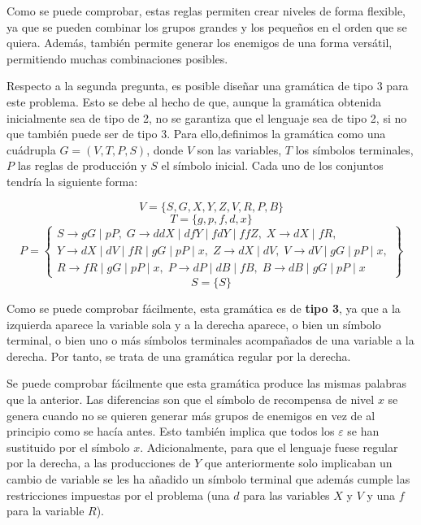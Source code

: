 \documentclass[11pt,a4paper]{article}
\begin{document}
		Como se puede comprobar, estas reglas permiten crear niveles de forma flexible, ya que se pueden combinar los
		grupos grandes y los pequeños en el orden que se quiera. Además, también permite generar los enemigos de una
		forma versátil, permitiendo muchas combinaciones posibles. \par
		
		Respecto a la segunda pregunta, es posible diseñar una gramática de tipo 3 para este problema. Esto se debe
		al hecho de que, aunque la gramática obtenida inicialmente sea de tipo de 2, no se garantiza que el lenguaje
		sea de tipo 2, si no que también puede ser de tipo 3. Para ello,definimos la gramática como una cuádrupla 
		$G = (V, T, P, S)$, donde $V$ son las variables, $T$ los símbolos terminales, $P$ las reglas de producción
		y $S$ el símbolo inicial. Cada uno de los conjuntos tendría la siguiente forma: \par
		
		\[V = \lbrace S, G, X, Y, Z, V, R, P, B \rbrace \]
		\[T = \lbrace g, p, f, d, x \rbrace \]
		\[P = \left\{
		\begin{array}{c}
		S \rightarrow gG \; | \; pP, \;
		G \rightarrow ddX \; | \; dfY \; | \; fdY \; | \; ffZ, \;
		X \rightarrow dX \; | \; fR, \\
		Y \rightarrow dX \; | \; dV \; | \; fR \; | \; gG \; | \; pP \; | \; x, \;
		Z \rightarrow dX \; | \; dV, \;
		V \rightarrow dV \; | \; gG \; | \; pP \; | \; x, \\
		R \rightarrow fR \; | \; gG \; | \; pP \; | \; x, \;
		P \rightarrow dP \; | \; dB \; | \; fB, \;
		B \rightarrow dB \; | \; gG \; | \; pP \; | \; x	
		\end{array}
		\right\}		
		\]
		\[S = \lbrace S \rbrace \]
		
		Como se puede comprobar fácilmente, esta gramática es de \textbf{tipo 3}, ya que a la izquierda aparece
		la variable sola y a la derecha aparece, o bien un símbolo terminal, o bien uno o más símbolos terminales
		acompañados de una variable a la derecha. Por tanto, se trata de una gramática regular por la derecha. \par
		
		Se puede comprobar fácilmente que esta gramática produce las mismas palabras que la anterior. Las diferencias
		son que el símbolo de recompensa de nivel $x$ se genera cuando no se quieren generar más grupos de enemigos
		en vez de al principio como se hacía antes. Esto también implica que todos los $\varepsilon$ se han sustituido
		por el símbolo $x$. Adicionalmente, para que el lenguaje fuese regular por la derecha, a las producciones de
		$Y$ que anteriormente solo implicaban un cambio de variable se les ha añadido un símbolo terminal
		que además cumple las restricciones impuestas por el problema (una $d$ para las variables $X$ y $V$ y una $f$
		para la variable $R$).
		
\end{document}
